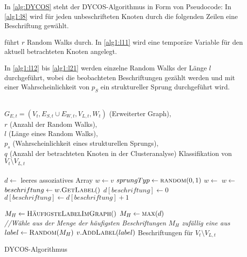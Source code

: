 In \cref{alg:DYCOS} steht der DYCOS-Algorithmus in Form von Pseudocode:
In \cref{alg1:l8} wird für jeden unbeschrifteten Knoten
durch die folgenden Zeilen eine Beschriftung gewählt.

 führt $r$ Random Walks durch.
In \cref{alg1:l11} wird eine temporäre Variable für den aktuell
betrachteten Knoten angelegt.

In \cref{alg1:l12} bis \cref{alg1:l21} werden einzelne Random Walks
der Länge $l$ durchgeführt, wobei die beobachteten Beschriftungen
gezählt werden und mit einer Wahrscheinlichkeit von $p_S$ ein
struktureller Sprung durchgeführt wird.

\begin{algorithm}[ht]
    \begin{algorithmic}[1]
        \Require \\$G_{E,t} = (V_t, E_{S,t} \cup E_{W,t}, V_{L,t}, W_t)$ (Erweiterter Graph),\\
                 $r$ (Anzahl der Random Walks),\\
                 $l$ (Länge eines Random Walks),\\
                 $p_s$ (Wahrscheinlichkeit eines strukturellen Sprungs),\\
                 $q$ (Anzahl der betrachteten Knoten in der Clusteranalyse)
        \Ensure  Klassifikation von $V_t \setminus V_{L,t}$\\
        \\

        \label{alg1:l8}
            \State $d \gets $ leeres assoziatives Array
            \label{alg1:l10}
                \State $w \gets v$\label{alg1:l11}
                \label{alg1:l12}
                    \State $sprungTyp \gets \Call{random}{0, 1}$
                        \State $w \gets$ 
                    \Else
                        \State $w \gets$ 
                    \EndIf
                    \State $beschriftung \gets w.\Call{GetLabel}{ }$
                        \State $d[beschriftung] \gets 0$
                    \EndIf
                    \State $d[beschriftung] \gets d[beschriftung] + 1$
                \EndFor\label{alg1:l21}
            \EndFor

             
                \State $M_H \gets \Call{HäufigsteLabelImGraph}{ }$
            \Else
                \State $M_H \gets \Call{max}{d}$
            \EndIf
            \\
            \State \textit{//Wähle aus der Menge der häufigsten Beschriftungen $M_H$ zufällig eine aus}
            \State $label \gets \Call{Random}{M_H}$
            \State $v.\Call{AddLabel}{label}$ 
        \EndFor
        \State \Return Beschriftungen für $V_t \setminus V_{L,t}$
    \end{algorithmic}
\caption{DYCOS-Algorithmus}
\label{alg:DYCOS}
\end{algorithm}


